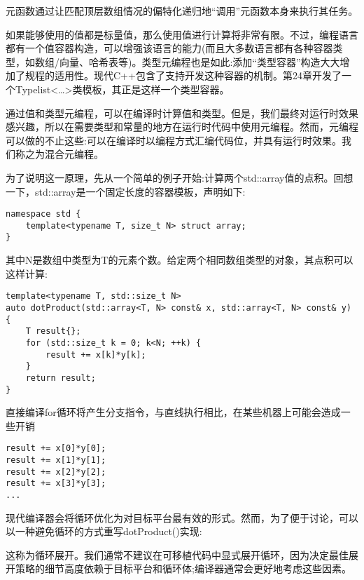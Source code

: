 元函数通过让匹配顶层数组情况的偏特化递归地“调用”元函数本身来执行其任务。

如果能够使用的值都是标量值，那么使用值进行计算将非常有限。不过，编程语言都有一个值容器构造，可以增强该语言的能力(而且大多数语言都有各种容器类型，如数组/向量、哈希表等)。类型元编程也是如此:添加“类型容器”构造大大增加了规程的适用性。现代C++包含了支持开发这种容器的机制。第24章开发了一个Typelist<…>类模板，其正是这样一个类型容器。


通过值和类型元编程，可以在编译时计算值和类型。但是，我们最终对运行时效果感兴趣，所以在需要类型和常量的地方在运行时代码中使用元编程。然而，元编程可以做的不止这些:可以在编译时以编程方式汇编代码位，并具有运行时效果。我们称之为混合元编程。

为了说明这一原理，先从一个简单的例子开始:计算两个std::array值的点积。回想一下，std::array是一个固定长度的容器模板，声明如下:

\begin{lstlisting}[style=styleCXX]
namespace std {
	template<typename T, size_t N> struct array;
}
\end{lstlisting}

其中N是数组中类型为T的元素个数。给定两个相同数组类型的对象，其点积可以这样计算:

\begin{lstlisting}[style=styleCXX]
template<typename T, std::size_t N>
auto dotProduct(std::array<T, N> const& x, std::array<T, N> const& y)
{
	T result{};
	for (std::size_t k = 0; k<N; ++k) {
		result += x[k]*y[k];
	}
	return result;
}
\end{lstlisting}

直接编译for循环将产生分支指令，与直线执行相比，在某些机器上可能会造成一些开销

\begin{lstlisting}[style=styleCXX]
result += x[0]*y[0];
result += x[1]*y[1];
result += x[2]*y[2];
result += x[3]*y[3];
...
\end{lstlisting}

现代编译器会将循环优化为对目标平台最有效的形式。然而，为了便于讨论，可以以一种避免循环的方式重写dotProduct()实现:

\begin{tcolorbox}[colback=webgreen!5!white,colframe=webgreen!75!black]
\hspace*{0.75cm}这称为循环展开。我们通常不建议在可移植代码中显式展开循环，因为决定最佳展开策略的细节高度依赖于目标平台和循环体;编译器通常会更好地考虑这些因素。
\end{tcolorbox}

